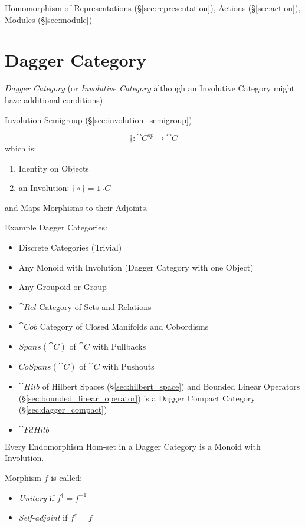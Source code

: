 Homomorphism of Representations (\S\ref{sec:representation}), Actions
(\S\ref{sec:action}), Modules (\S\ref{sec:module})



\section{Dagger Category}\label{sec:dagger_category}

\emph{Dagger Category} (or \emph{Involutive Category} although an
Involutive Category might have additional conditions) %

Involution Semigroup (\S\ref{sec:involution_semigroup})

\[
  \dag : \cat{C}^{op} \rightarrow \cat{C}
\]
which is:
\begin{enumerate}
  \item Identity on Objects
  \item an Involution: $\dag \circ \dag = 1_\cat{C}$
\end{enumerate}
and Maps Morphisms to their Adjoints. %

Example Dagger Categories:
\begin{itemize}
  \item Discrete Categories (Trivial)
  \item Any Monoid with Involution (Dagger Category with one Object)
  \item Any Groupoid or Group
  \item $\cat{Rel}$ Category of Sets and Relations
  \item $\cat{Cob}$ Category of Closed Manifolds and Cobordisms
  \item $Spans(\cat{C})$ of $\cat{C}$ with Pullbacks
  \item $CoSpans(\cat{C})$ of $\cat{C}$ with Pushouts
  \item $\cat{Hilb}$ of Hilbert Spaces (\S\ref{sec:hilbert_space}) and
    Bounded Linear Operators (\S\ref{sec:bounded_linear_operator}) is
    a Dagger Compact Category (\S\ref{sec:dagger_compact})
  \item $\cat{FdHilb}$
\end{itemize}

Every Endomorphism Hom-set in a Dagger Category is a Monoid with
Involution.

Morphism $f$ is called:
\begin{itemize}
  \item \emph{Unitary} if $f^\dag = f^{-1}$
  \item \emph{Self-adjoint} if $f^\dag = f$
\end{itemize}

